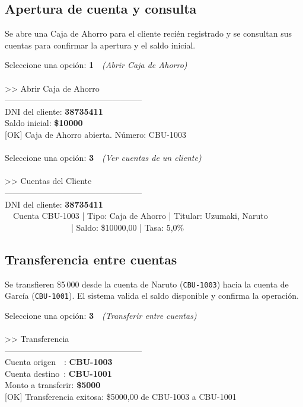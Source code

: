 \documentclass[12pt, a4paper]{article}
\begin{document}
\newpage
\subsection{Apertura de cuenta y consulta}

Se abre una Caja de Ahorro para el cliente recién registrado y se
consultan sus cuentas para confirmar la apertura y el saldo inicial.

\begin{tcolorbox}[
  enhanced, breakable,
  colback=black!92!white,
  colframe=black!60!white,
  coltext=green!70!white,
  boxrule=0.5pt,
  arc=4pt,
  fontupper=\ttfamily\small
]
Seleccione una opción: \textbf{1}~~\textrm{\textit{(Abrir Caja de Ahorro)}}\\
~\\
\textgreater\textgreater{} Abrir Caja de Ahorro\\
--------------------------------------------------\\
DNI del cliente: \textbf{38735411}\\
Saldo inicial: \textbf{\$10000}\\
{[OK]} Caja de Ahorro abierta. Número: CBU-1003\\
~\\
Seleccione una opción: \textbf{3}~~\textrm{\textit{(Ver cuentas de un cliente)}}\\
~\\
\textgreater\textgreater{} Cuentas del Cliente\\
--------------------------------------------------\\
DNI del cliente: \textbf{38735411}\\
~~Cuenta CBU-1003 | Tipo: Caja de Ahorro | Titular: Uzumaki, Naruto\\
~~~~~~~~~~~~~~~~| Saldo: \$10000,00 | Tasa: 5,0\%
\end{tcolorbox}

\subsection{Transferencia entre cuentas}

Se transfieren \$5\,000 desde la cuenta de Naruto (\texttt{CBU-1003})
hacia la cuenta de García (\texttt{CBU-1001}). El sistema valida el
saldo disponible y confirma la operación.

\begin{tcolorbox}[
  enhanced, breakable,
  colback=black!92!white,
  colframe=black!60!white,
  coltext=green!70!white,
  boxrule=0.5pt,
  arc=4pt,
  fontupper=\ttfamily\small
]
Seleccione una opción: \textbf{3}~~\textrm{\textit{(Transferir entre cuentas)}}\\
~\\
\textgreater\textgreater{} Transferencia\\
--------------------------------------------------\\
Cuenta origen~~: \textbf{CBU-1003}\\
Cuenta destino~: \textbf{CBU-1001}\\
Monto a transferir: \textbf{\$5000}\\
{[OK]} Transferencia exitosa: \$5000,00 de CBU-1003 a CBU-1001
\end{tcolorbox}
\end{document}
